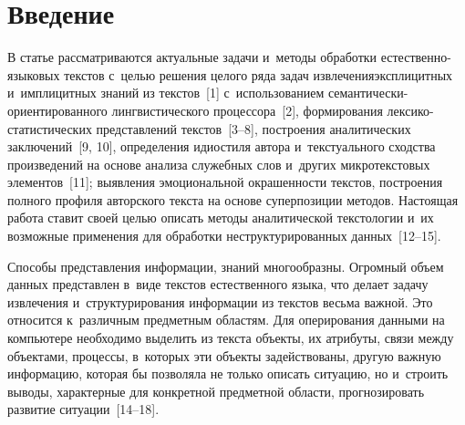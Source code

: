 
  
\vspace*{2pt}



\thispagestyle{headings}

\begin{multicols}{2}

\label{st\stat}
      
    \section{Введение}
    
    \vspace*{-5pt}
    
     В статье рассматриваются актуальные задачи и~методы обработки 
естественно-языковых текс\-тов с~целью решения целого ряда задач 
извлечения\linebreak эксплицитных и~имплицитных знаний из текс\-тов~[1] 
с~использованием се\-ман\-ти\-чески-ори\-ен\-ти\-ро\-ван\-но\-го 
лингвистического процессора~[2], формирования  
лек\-си\-ко-ста\-ти\-сти\-че\-ских представлений текстов~[3--8], построения 
аналитических заключений~[9, 10], определения идиостиля автора 
и~текстуального сходства произведений на основе анализа служебных слов 
и~других микротекстовых элементов~[11]; выявления эмоциональной 
окрашенности текстов, построения полного профиля авторского текста на 
основе суперпозиции методов. Настоящая работа ставит своей целью описать 
методы аналитической текстологии и~их возможные применения для 
обработки неструктурированных данных~[12--15]. 
     
     Способы представления информации, знаний многообразны. Огромный 
объем данных пред\-став\-лен в~виде текстов естественного языка, что делает 
задачу извлечения и~структурирования информации из текстов весьма 
важной. Это относится к~различным предметным областям. Для 
оперирования данными на компьютере необходимо выделить из текста 
объекты, их атрибуты, связи между объектами, процессы, в~которых эти 
объекты задействованы, другую важную информацию, которая бы позволяла 
не только описать ситуацию, но и~строить выводы, характерные для 
конкретной предметной области, прогнозировать развитие  
ситуации~[14--18].
     

\end{multicols}
